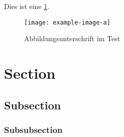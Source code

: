 Dies ist eine \ref{fig:abb1}.

\begin{figure}[H]
\centering
\texttt{[image: example-image-a]}
\caption[Abbildungsunterschrift im Abbildungsverzeichnis]{Abbildungsunterschrift im Test}
\label{fig:abb1}
\end{figure} 



\section{Section}

\subsection{Subsection}

\subsubsection{Subsubsection}
